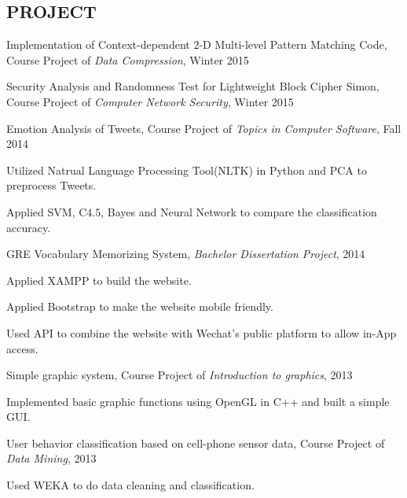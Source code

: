 \documentclass{res}
\newcommand{\additemindent}{\addtolength{\itemindent}{1em}}
\begin{document}
\begin{resume}
\section{PROJECT}
\begin{asparaenum}

	\item Implementation of Context-dependent $2$-D Multi-level Pattern Matching Code, Course Project of \emph{Data Compression}, Winter 2015

	\item Security Analysis and Randomness Test for Lightweight Block Cipher Simon, Course Project of \emph{Computer Network Security}, Winter 2015

	\item Emotion Analysis of Tweets, Course Project of \emph{Topics in Computer Software}, Fall 2014
		\begin{asparaitem}
			\additemindent
			\item Utilized Natrual Language Processing Tool(NLTK) in Python and PCA to preprocess Tweets.
			\item Applied SVM, C$4.5$, Bayes and Neural Network to compare the classification accuracy.
		\end{asparaitem}

	\item GRE Vocabulary Memorizing System, \emph{Bachelor Dissertation Project}, 2014
		\begin{asparaitem}
			\additemindent
			\item Applied XAMPP to build the website.
			\item Applied Bootstrap to make the website mobile friendly.
			\item Used API to combine the website with Wechat's public platform to allow in-App access.
		\end{asparaitem}

	\item Simple graphic system, Course Project of \emph{Introduction to graphics}, 2013
		\begin{asparaitem}
			\additemindent
			\item Implemented basic graphic functions using OpenGL in C++ and built a simple GUI. 
		\end{asparaitem}

	
 	\item User behavior classification based on cell-phone sensor data, Course Project of \emph{Data Mining}, 2013
 		\begin{asparaitem}
			\additemindent
			\item Used WEKA to do data cleaning and classification. 
		\end{asparaitem}


\end{asparaenum}
\end{resume}
\end{document}
